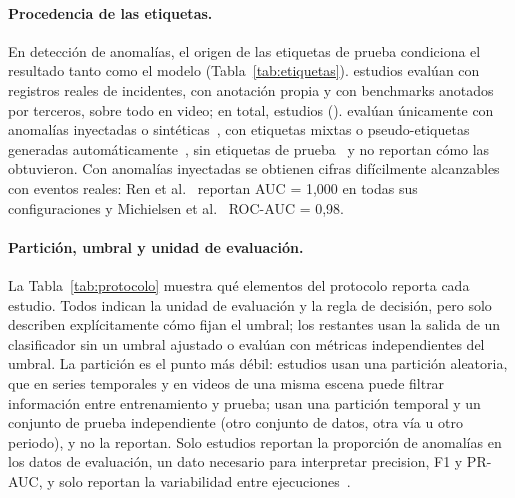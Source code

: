 \documentclass[12pt, a4paper]{article}
\begin{document}
\paragraph{Procedencia de las etiquetas.} En detección de anomalías, el origen de las etiquetas de prueba condiciona el resultado tanto como el modelo (Tabla~\ref{tab:etiquetas}). \NetiqReal{} estudios evalúan con registros reales de incidentes, \NetiqManual{} con anotación propia y \NetiqBench{} con benchmarks anotados por terceros, sobre todo en video; en total, \NetiqRealesTotal{} estudios (\PTodosReal). \NetiqInyect{} evalúan únicamente con anomalías inyectadas o sintéticas~\cite{chakraborty2023structural,ren2024graph,wang2024multiscale,park2025graph,mbuya2025graph}, \NetiqMixto{} con etiquetas mixtas o pseudo-etiquetas generadas automáticamente~\cite{sun2022data,barreno2024driving,onsu2025intelligent,jadhav2026multistage}, \NetiqSin{} sin etiquetas de prueba~\cite{hu2023detecting,mao2024detecting} y \NetiqNR{} no reportan cómo las obtuvieron. Con anomalías inyectadas se obtienen cifras difícilmente alcanzables con eventos reales: Ren et al.~\cite{ren2024graph} reportan AUC = 1,000 en todas sus configuraciones y Michielsen et al.~\cite{michielsen2024history} ROC-AUC = 0,98.



\paragraph{Partición, umbral y unidad de evaluación.} La Tabla~\ref{tab:protocolo} muestra qué elementos del protocolo reporta cada estudio. Todos indican la unidad de evaluación y la regla de decisión, pero solo \NumbralExplicito{} describen explícitamente cómo fijan el umbral; los \NumbralNoAplica{} restantes usan la salida de un clasificador sin un umbral ajustado o evalúan con métricas independientes del umbral. La partición es el punto más débil: \NpartAleatoria{} estudios usan una partición aleatoria, que en series temporales y en videos de una misma escena puede filtrar información entre entrenamiento y prueba; \NpartTemporal{} usan una partición temporal y \NpartIndep{} un conjunto de prueba independiente (otro conjunto de datos, otra vía u otro periodo), y \NpartNR{} no la reportan. Solo \Ntasa{} estudios reportan la proporción de anomalías en los datos de evaluación, un dato necesario para interpretar precision, F1 y PR-AUC, y solo \Nvariabilidad{} reportan la variabilidad entre ejecuciones~\cite{sun2022data,chakraborty2023structural,michielsen2024history}.
\end{document}
